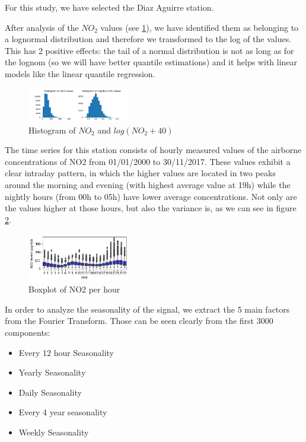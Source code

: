 \documentclass[a4paper,twocolumn,5p]{elsarticle}
\begin{document}
For this study, we have selected the Diaz Aguirre station.

After analysis of the $NO_2$ values (see \ref{figure:histo_no2}), we have identified them 
as belonging to a lognormal distribution and therefore we transformed to 
the log of the values. This has 2 positive effects: the tail of a normal distribution 
is not as long as for the lognom (so we will have better quantile estimations) and 
it helps with linear models like the linear quantile regression.

\begin{figure}
  \centering
  \includegraphics[width=0.4\textwidth]{histo_no2}
  \caption{Histogram of $NO_2$ and $log(NO_2+40)$}
  \label{figure:histo_no2}
\end{figure}

The time series for this station consists of hourly
measured values of the airborne concentrations of NO2
from 01/01/2000 to 30/11/2017. These values exhibit a clear intraday 
pattern, in which the
higher values are located in two peaks around the morning
and evening (with highest average value at 19h) while the 
nightly hours (from 00h to 05h) have lower average concentrations. 
Not only are the values higher at those hours, but also
the variance is, as we can see in figure \ref{figure:variance}. 
 
\begin{figure}
  \centering
      \includegraphics[width=0.4\textwidth]{NO2Var}
  \caption{Boxplot of NO2 per hour}
\label{figure:variance}
\end{figure}

In order to analyze the seasonality of the signal, we extract the 5 main factors 
from the Fourier Transform. Those can be seen clearly from the first 3000 components:

\begin{itemize}
  \item Every 12 hour Seasonality
  \item Yearly Seasonality
  \item Daily Seasonality
  \item Every 4 year seasonality
  \item Weekly Seasonality
\end{itemize} 
\end{document}
